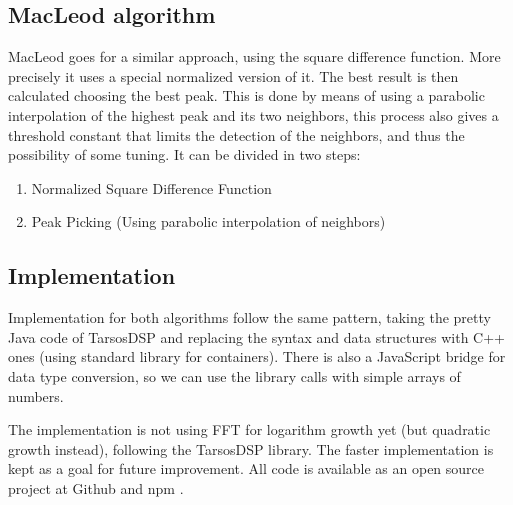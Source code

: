 \subsection{MacLeod algorithm}
MacLeod \cite{MacLeodArticle} goes for a similar approach, using the square difference
function. More precisely it uses a special normalized version of it. The best result
is then calculated choosing the best peak. This is done by means of using a parabolic
interpolation of the highest peak and its two neighbors, this process also gives a
threshold constant that limits the detection of the neighbors, and thus the possibility of some tuning.
It can be divided in two steps:
\begin{enumerate}
  \item Normalized Square Difference Function
  \item Peak Picking (Using parabolic interpolation of neighbors)
\end{enumerate}

\subsection{Implementation}
\label{pitch-detection-implementation}
Implementation for both algorithms follow the same pattern, taking the pretty
Java code of TarsosDSP \cite{TarsosDSP} and replacing the syntax and data structures
with C++ ones (using standard library for containers). There is also a JavaScript bridge
for data type conversion, so we can use the library calls with simple arrays of numbers.

The implementation is not using FFT for logarithm growth yet (but quadratic growth
instead), following the TarsosDSP library. The faster implementation is kept as
a goal for future improvement. All code is available as an open source project at
Github and npm \cite{node-pitchfinder}.
